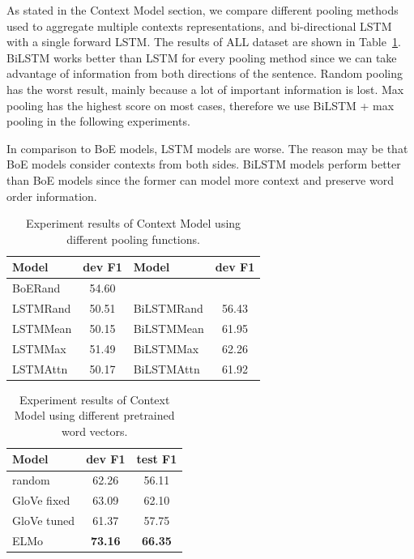 \documentclass[letterpaper]{article} %
\begin{document}
As stated in the Context Model section, we compare different pooling methods used to aggregate multiple contexts representations, and bi-directional LSTM with a single forward LSTM. The results of ALL dataset are shown in Table~\ref{table:contextresult}. BiLSTM works better than LSTM for every pooling method since we can take advantage of information from both directions of the sentence. Random pooling has the worst result, mainly because a lot of important information is lost. Max pooling has the highest score on most cases, therefore we use BiLSTM + max pooling in the following experiments.

In comparison to BoE models, LSTM models are worse. The reason may be that BoE models consider contexts from both sides. BiLSTM models perform better than BoE models since the former can model more context and preserve word order information.

\begin{table}[t]
\centering
\begin{tabular}{l c | l c}
\hline
{\bf Model} & {\bf dev F1 } & {\bf Model} & {\bf dev F1} \\
\hline\hline
BoERand & 54.60 && \\
\hline
LSTMRand & 50.51 & BiLSTMRand & 56.43 \\
LSTMMean & 50.15 & BiLSTMMean & 61.95 \\
LSTMMax & 51.49 & BiLSTMMax  & 62.26 \\
LSTMAttn & 50.17 & BiLSTMAttn & 61.92 \\
\hline
\end{tabular}
\caption{Experiment results of Context Model using different pooling functions.}
\label{table:contextresult}
\end{table}

\begin{table}[t]
\centering
\begin{tabular}{l c c}
\hline
{\bf Model}  & {\bf dev F1 } & {\bf test F1 } \\
\hline\hline
random  &  62.26  & 56.11 \\
GloVe fixed  & 63.09  & 62.10 \\
GloVe tuned  & 61.37  & 57.75  \\
ELMo  & {\bf 73.16} & {\bf 66.35} \\
\hline
\end{tabular}
\caption{Experiment results of Context Model using different pretrained word vectors.}
\label{table:pretrain}
\end{table}
\end{document}
